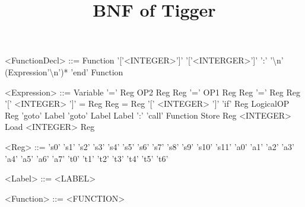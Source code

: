 \documentclass{article}
\title{BNF of Tigger}
\begin{document}
\setlength{\grammarindent}{8em} %
\begin{grammar}

<FunctionDecl> ::= Function '['<INTEGER>']' '['<INTERGER>']' ':' '\textbackslash n' (Expression'\textbackslash n')* 'end' Function


<Expression>	::=	Variable '=' Reg OP2 Reg
\alt Reg '=' OP1 Reg
\alt Reg '=' Reg
\alt Reg '[' <INTEGER> ']' = Reg
\alt Reg = Reg '[' <INTEGER> ']'
\alt 'if' Reg LogicalOP Reg 'goto' Label
\alt 'goto' Label
\alt Label ':'
\alt 'call' Function
\alt Store Reg <INTEGER>
\alt Load <INTEGER> Reg

<Reg> ::= 's0'
\alt 's1'
\alt 's2'
\alt 's3'
\alt 's4'
\alt 's5'
\alt 's6'
\alt 's7'
\alt 's8'
\alt 's9'
\alt 's10'
\alt 's11'
\alt 'a0'
\alt 'a1'
\alt 'a2'
\alt 'a3'
\alt 'a4'
\alt 'a5'
\alt 'a6'
\alt 'a7'
\alt 't0'
\alt 't1'
\alt 't2'
\alt 't3'
\alt 't4'
\alt 't5'
\alt 't6'

<Label> ::= <LABEL>

<Function> ::= <FUNCTION>

\end{grammar}
\end{document}
